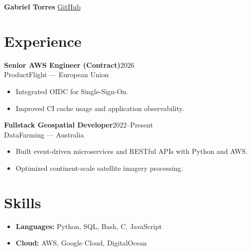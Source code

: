 \documentclass[10pt,a4paper]{article}
\newcommand{\experience}[4]{%
  \vspace{0.35em}
  \textbf{#1}\hfill #3\\
  \textcolor{blue!60!black}{#2} --- #4
}
\newcommand{\skillrow}[2]{\item \textbf{#1:} #2}
\begin{document}
{\LARGE\bfseries Gabriel Torres}\hfill
\href{https://github.com/gabtorres-ph}{GitHub}

\section*{Experience}

\experience{Senior AWS Engineer (Contract)}{ProductFlight}{2026}{European Union}
\begin{itemize}[itemsep=0.1em]
  \item Integrated OIDC for Single-Sign-On.
  \item Improved CI cache usage and application observability.
\end{itemize}

\experience{Fullstack Geospatial Developer}{DataFarming}{2022--Present}{Australia}
\begin{itemize}[itemsep=0.1em]
  \item Built event-driven microservices and RESTful APIs with Python and AWS.
  \item Optimized continent-scale satellite imagery processing.
\end{itemize}

\section*{Skills}
\begin{itemize}[itemsep=0.1em]
  \skillrow{Languages}{Python, SQL, Bash, C, JavaScript}
  \skillrow{Cloud}{AWS, Google Cloud, DigitalOcean}
\end{itemize}
\end{document}
